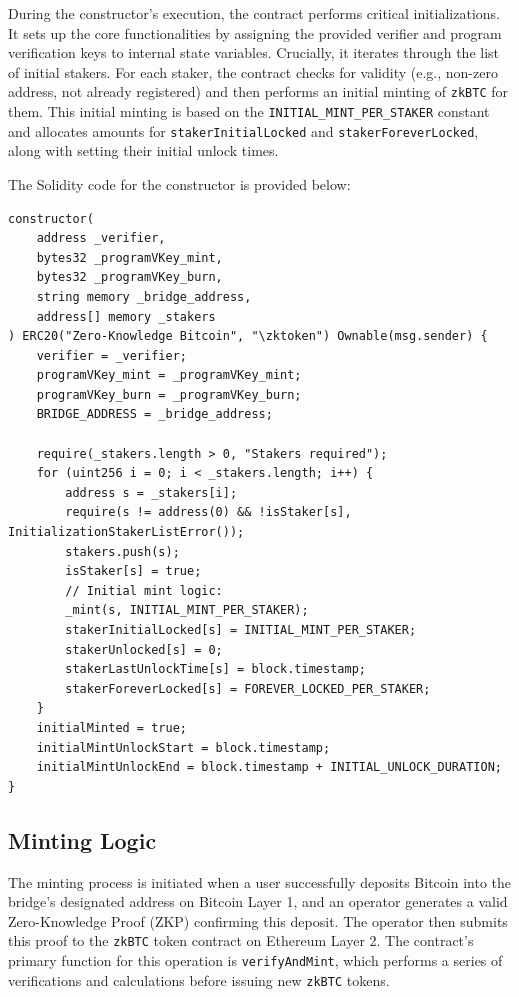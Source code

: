 \documentclass{DESSThesis}
\newcommand{\zktoken}{\texttt{zkBTC}}
\begin{document}
During the constructor's execution, the contract performs critical initializations. It sets up the core functionalities by assigning the provided verifier and program verification keys to internal state variables. Crucially, it iterates through the list of initial stakers. For each staker, the contract checks for validity (e.g., non-zero address, not already registered) and then performs an initial minting of \texttt{\zktoken} for them. This initial minting is based on the \texttt{INITIAL\_MINT\_PER\_STAKER} constant and allocates amounts for \texttt{stakerInitialLocked} and \texttt{stakerForeverLocked}, along with setting their initial unlock times.


The Solidity code for the constructor is provided below:

\begin{lstlisting}[language=Solidity, caption=\zktoken Token Contract Constructor, label=lst:constructor]
constructor(
    address _verifier,
    bytes32 _programVKey_mint,
    bytes32 _programVKey_burn,
    string memory _bridge_address,
    address[] memory _stakers
) ERC20("Zero-Knowledge Bitcoin", "\zktoken") Ownable(msg.sender) {
    verifier = _verifier;
    programVKey_mint = _programVKey_mint;
    programVKey_burn = _programVKey_burn;
    BRIDGE_ADDRESS = _bridge_address;

    require(_stakers.length > 0, "Stakers required");
    for (uint256 i = 0; i < _stakers.length; i++) {
        address s = _stakers[i];
        require(s != address(0) && !isStaker[s], InitializationStakerListError());
        stakers.push(s);
        isStaker[s] = true;
        // Initial mint logic:
        _mint(s, INITIAL_MINT_PER_STAKER);
        stakerInitialLocked[s] = INITIAL_MINT_PER_STAKER;
        stakerUnlocked[s] = 0;
        stakerLastUnlockTime[s] = block.timestamp;
        stakerForeverLocked[s] = FOREVER_LOCKED_PER_STAKER;
    }
    initialMinted = true;
    initialMintUnlockStart = block.timestamp;
    initialMintUnlockEnd = block.timestamp + INITIAL_UNLOCK_DURATION;
}
\end{lstlisting}


\subsection{Minting Logic}
The minting process is initiated when a user successfully deposits Bitcoin into the bridge's designated address on Bitcoin Layer 1, and an operator generates a valid Zero-Knowledge Proof (ZKP) confirming this deposit. The operator then submits this proof to the \texttt{\zktoken} token contract on Ethereum Layer 2. The contract's primary function for this operation is \texttt{verifyAndMint}, which performs a series of verifications and calculations before issuing new \texttt{\zktoken} tokens.
\end{document}
